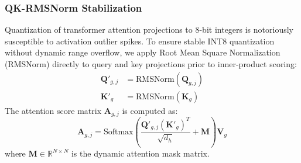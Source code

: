 \documentclass[10pt,journal,compsoc]{IEEEtran}
\begin{document}
\subsubsection{QK-RMSNorm Stabilization}
Quantization of transformer attention projections to 8-bit integers is notoriously susceptible to activation outlier spikes. To ensure stable INT8 quantization without dynamic range overflow, we apply Root Mean Square Normalization (RMSNorm) \cite{zhang2019rms} directly to query and key projections prior to inner-product scoring:
\begin{align}
\mathbf{Q}'_{g,j} &= \mathrm{RMSNorm}(\mathbf{Q}_{g,j}) \\
\mathbf{K}'_g &= \mathrm{RMSNorm}(\mathbf{K}_g)
\end{align}
The attention score matrix $\mathbf{A}_{g,j}$ is computed as:
\begin{equation}
\mathbf{A}_{g,j} = \mathrm{Softmax}\left( \frac{\mathbf{Q}'_{g,j} (\mathbf{K}'_g)^T}{\sqrt{d_h}} + \mathbf{M} \right) \mathbf{V}_g
\end{equation}
where $\mathbf{M} \in \mathbb{R}^{N \times N}$ is the dynamic attention mask matrix.
\end{document}

